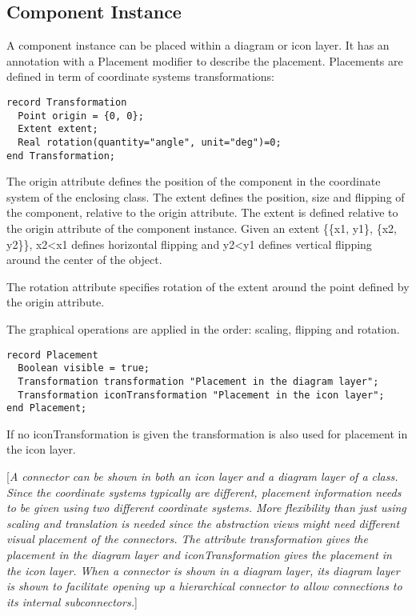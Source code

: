 \subsection{Component Instance}

A component instance can be placed within a diagram or icon layer. It
has an annotation with a Placement modifier to describe the placement.
Placements are defined in term of coordinate systems transformations:

\begin{lstlisting}[language=modelica]
record Transformation
  Point origin = {0, 0};
  Extent extent;
  Real rotation(quantity="angle", unit="deg")=0;
end Transformation;
\end{lstlisting}
The origin attribute defines the position of the component in the
coordinate system of the enclosing class. The extent defines the
position, size and flipping of the component, relative to the origin
attribute. The extent is defined relative to the origin attribute of the
component instance. Given an extent \{\{x1, y1\}, \{x2, y2\}\},
x2\textless{}x1 defines horizontal flipping and y2\textless{}y1 defines
vertical flipping around the center of the object.

The rotation attribute specifies rotation of the extent around the point
defined by the origin attribute.

The graphical operations are applied in the order: scaling, flipping and
rotation.

\begin{lstlisting}[language=modelica]
record Placement
  Boolean visible = true;
  Transformation transformation "Placement in the diagram layer";
  Transformation iconTransformation "Placement in the icon layer";
end Placement;
\end{lstlisting}
If no iconTransformation is given the transformation is also used for
placement in the icon layer.

{[}\emph{A connector can be shown in both an icon layer and a diagram
layer of a class. Since the coordinate systems typically are different,
placement information needs to be given using two different coordinate
systems. More flexibility than just using scaling and translation is
needed since the abstraction views might need different visual placement
of the connectors. The attribute transformation gives the placement in
the diagram layer and iconTransformation gives the placement in the icon
layer. When a connector is shown in a diagram layer, its diagram layer
is shown to facilitate opening up a hierarchical connector to allow
connections to its internal subconnectors.}{]}

